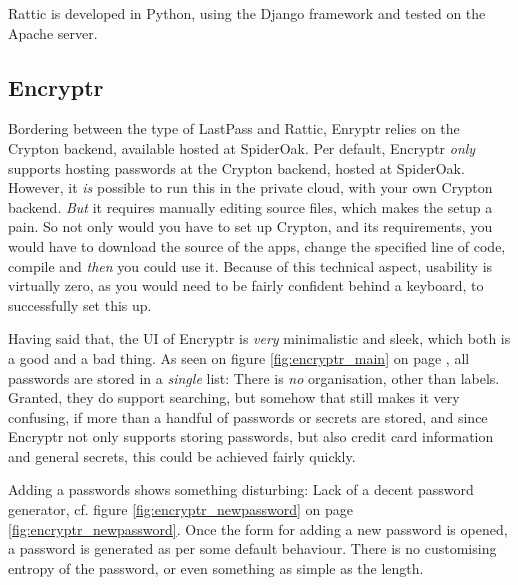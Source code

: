 			Rattic is developed in Python, using the Django framework and tested on the Apache server.



		\subsection{Encryptr}
			Bordering between the type of LastPass and Rattic, Enryptr \cite{encryptr} relies on the Crypton\cite{crypton} backend\cite{encryptr_backend}, available hosted at SpiderOak\cite{crypton_spideroak}. Per default, Encryptr \emph{only} supports hosting passwords at the Crypton backend, hosted at SpiderOak. However, it \emph{is} possible to run this in the private cloud, with your own Crypton backend. \emph{But} it requires manually editing source files\cite{encryptr_selfhost}, which makes the setup a pain. So not only would you have to set up Crypton, and its requirements, you would have to download the source of the apps, change the specified line of code, compile and \emph{then} you could use it. Because of this technical aspect, usability is virtually zero, as you would need to be fairly confident behind a keyboard, to successfully set this up.

			Having said that, the UI of Encryptr is \emph{very} minimalistic and sleek, which both is a good and a bad thing. As seen on figure \ref{fig:encryptr_main} on page \pageref{fig:encryptr_main}, all passwords are stored in a \emph{single} list: There is \emph{no} organisation, other than labels. Granted, they do support searching, but somehow that still makes it very confusing, if more than a handful of passwords or secrets are stored, and since Encryptr not only supports storing passwords, but also credit card information and general secrets, this could be achieved fairly quickly.

			Adding a passwords shows something disturbing: Lack of a decent password generator, cf. figure \ref{fig:encryptr_newpassword} on page \ref{fig:encryptr_newpassword}. Once the form for adding a new password is opened, a password is generated as per some default behaviour. There is no customising entropy of the password, or even something as simple as the length.

